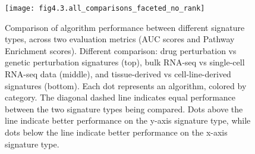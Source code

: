\begin{figure}[htbp]
    \centering
    \texttt{[image: fig4.3.all\_comparisons\_faceted\_no\_rank]}
    \caption[Comparison of algorithm performance between different signature types.]{Comparison of algorithm performance between different signature types, across two evaluation metrics (\gls{AUC} scores and Pathway Enrichment scores). Different comparison: drug perturbation vs genetic perturbation signatures (top), bulk RNA-seq vs single-cell RNA-seq data (middle), and tissue-derived vs cell-line-derived signatures (bottom). Each dot represents an algorithm, colored by category. The diagonal dashed line indicates equal performance between the two signature types being compared. Dots above the line indicate better performance on the y-axis signature type, while dots below the line indicate better performance on the x-axis signature type.}
    \label{fig:fig4.3.all_comparisons_faceted_no_rank}
\end{figure}


